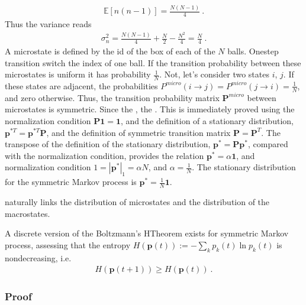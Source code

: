 \documentclass[letterpaper,10pt,english]{jupyterBook}
\begin{document}
\begin{equation*}
\begin{split}\mathbb{E}[n(n-1)] = \frac{N(N-1)}{4} \ .\end{split}
\end{equation*}
\sphinxAtStartPar
Thus the variance reads
\begin{equation*}
\begin{split}\sigma^2_n = \frac{N(N-1)}{4} + \frac{N}{2} - \frac{N^2}{4} = \frac{N}{4} \ .\end{split}
\end{equation*}
\sphinxAtStartPar
{} A microstate is defined by the id of the box of each of the \(N\) balls. One\sphinxhyphen{}step transition switch the index of one ball. If the transition probability between these microstates is uniform it has probability \(\frac{1}{N}\). Not, let’s consider two states \(i\), \(j\). If these states are adjacent, the probabilities \(P^{micro}(i \rightarrow j) = P^{micro}(j \rightarrow i) = \frac{1}{N}\), and zero otherwise. Thus, the transition probability matrix \(\mathbf{P}^{micro}\) between microstates is symmetric. Since the , the . This is immediately proved using the normalization condition \(\mathbf{P} \mathbf{1} = \mathbf{1}\), and the definition of a stationary distribution, \(\mathbf{p}^{* T} = \mathbf{p}^{* T} \mathbf{P}\), and the definition of symmetric transition matrix \(\mathbf{P} = \mathbf{P}^T\). The transpose of the definition of the stationary distribution, \(\mathbf{p}^* = \mathbf{P} \mathbf{p}^*\), compared with the normalization condition, provides the relation \(\mathbf{p}^* = \alpha \mathbf{1}\), and normalization condition \(1 = |\mathbf{p}^*|_1 = \alpha N\), and \(\alpha = \frac{1}{N}\). The stationary distribution for the symmetric Markov process is \(\mathbf{p}^* = \frac{1}{N} \mathbf{1}\).

\sphinxAtStartPar
{} naturally links the distribution of microstates and the distribution of the macrostates.

\sphinxAtStartPar
{} A discrete version of the Boltzmann’s H\sphinxhyphen{}Theorem exists for symmetric Markov process, assessing that the entropy \(H(\mathbf{p}(t)) := - \sum_k p_k(t) \ln p_k(t)\) is non\sphinxhyphen{}decreasing, i.e.
\begin{equation*}
\begin{split}H(\mathbf{p}(t+1)) \ge H(\mathbf{p}(t)) \ .\end{split}
\end{equation*}\subsubsection*{Proof}
\end{document}
